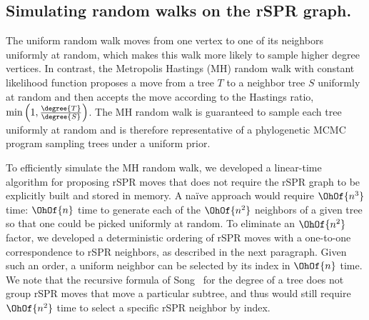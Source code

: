 \documentclass[10pt,twoside,leqno,twocolumn]{article}
\begin{document}
\subsection{Simulating random walks on the rSPR graph.}
\label{sec:random_walks}
The uniform random walk moves from one vertex to one of its neighbors uniformly at random, which makes this walk more likely to sample higher degree vertices.
In contrast, the Metropolis Hastings (MH) random walk with constant likelihood function proposes a move from a tree $T$ to a neighbor tree $S$ uniformly at random and then accepts the move according to the Hastings ratio, $\min\left(1, \frac{\degree{T}}{\degree{S}}\right)$.
The MH random walk is guaranteed to sample each tree uniformly at random and is therefore representative of a phylogenetic MCMC program sampling trees under a uniform prior.

To efficiently simulate the MH random walk, we developed a linear-time algorithm for proposing rSPR moves that does not require the rSPR graph to be explicitly built and stored in memory.
A na\"ive approach would require $\OhOf{n^3}$ time: $\OhOf{n}$ time to generate each of the $\OhOf{n^2}$ neighbors of a given tree so that one could be picked uniformly at random.
To eliminate an $\OhOf{n^2}$ factor, we developed a deterministic ordering of rSPR moves with a one-to-one correspondence to rSPR neighbors, as described in the next paragraph.
Given such an order, a uniform neighbor can be selected by its index in $\OhOf{n}$ time.
We note that the recursive formula of Song~\cite{Song2003-gf} for the degree of a tree does not group rSPR moves that move a particular subtree, and thus would still require $\OhOf{n^2}$ time to select a specific rSPR neighbor by index.
\end{document}
